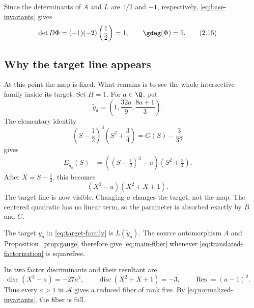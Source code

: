 Since the determinants of \(A\) and \(L\) are \(1/2\) and \(-1\),
respectively, \eqref{eq:base-invariants} gives
\[
 \det D\Phi=(-1)(-2)\left(\frac12\right)=1,
 \qquad
 \gdeg(\Phi)=5.
 \tag{2.15}\label{eq:normalized-invariants}
\]

\subsection{Why the target line appears}

At this point the map is fixed.  What remains is to see the whole
intersective family inside its target.  Set \(\Pi=1\).  For \(a\in\Q\), put
\[
 \widetilde y_a=
 \left(1,\frac{32a}{9},\frac{8a+1}{3}\right).
 \tag{2.16}\label{eq:unnormalized-target}
\]
The elementary identity
\[
 \left(S-\frac12\right)^3\left(S^2+\frac34\right)
 =G(S)-\frac3{32}
 \tag{2.17}\label{eq:centered-identity}
\]
gives
\begin{align}
 E_{\widetilde y_a}(S)
 &=
 \left(\left(S-\frac12\right)^3-a\right)
 \left(S^2+\frac34\right).
 \tag{2.18}\label{eq:target-factorization}
\end{align}
After \(X=S-\tfrac12\), this becomes
\[
 (X^3-a)(X^2+X+1).
 \tag{2.19}\label{eq:translated-factorization}
\]
The target line is now visible.  Changing \(a\) changes the target, not the
map.  The centered quadratic has no linear term, so the parameter is
absorbed exactly by \(B\) and \(C\).

The target \(y_a\) in \eqref{eq:target-family} is \(L(\widetilde y_a)\).  The source
automorphism \(A\) and Proposition~\ref{prop:gauge} therefore give
\eqref{eq:main-fiber} whenever \eqref{eq:translated-factorization} is squarefree.

Its two factor discriminants and their resultant are
\[
 \operatorname{disc}(X^3-a)=-27a^2,\qquad
 \operatorname{disc}(X^2+X+1)=-3,\qquad
 \operatorname{Res}=(a-1)^2.
 \tag{2.20}\label{eq:disc-resultant}
\]
Thus every \(a>1\) in \(\mathcal A\) gives a reduced fiber of rank five.
By \eqref{eq:normalized-invariants}, the fiber is full.
